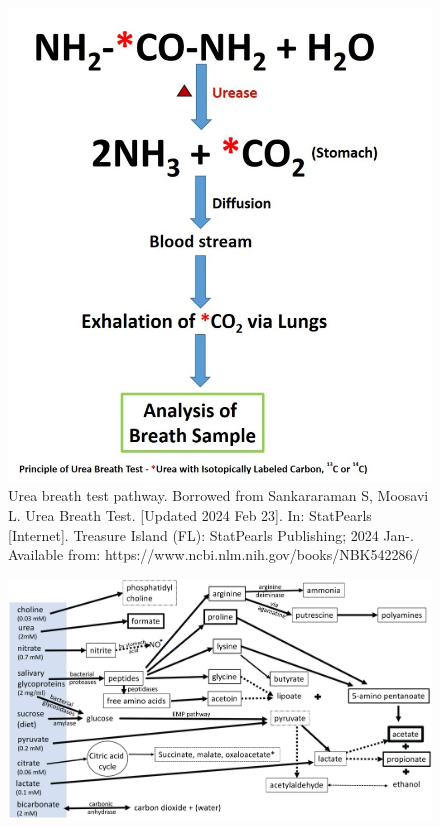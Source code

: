 \begin{tcolorbox}[
    title=Saliva,
    title filled=false,
    colback=blue!5!white,
    colframe=blue!75!black]
    \begin{figure}[!ht]
        \centering
        \includegraphics[width=1\linewidth]{./figure/urea_test.jpg}
        \caption{Urea breath test pathway. Borrowed from  Sankararaman S, Moosavi L. Urea Breath Test. [Updated 2024 Feb 23]. 
        In: StatPearls [Internet]. Treasure Island (FL): StatPearls Publishing; 2024 Jan-. Available 
        from: https://www.ncbi.nlm.nih.gov/books/NBK542286/}
        \label{fig:urea_test}
    \end{figure}
    \begin{figure}[!ht]
        \centering
        \includegraphics[width=1\linewidth]{./figure/saliva_content.jpeg}

\end{figure}
\end{tcolorbox}
